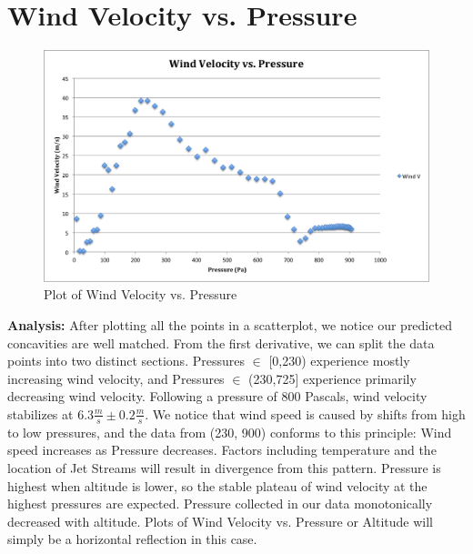 \documentclass{journal}
\begin{document}
\part{Wind Velocity vs. Pressure}
\begin{figure}[H]
\centering
\includegraphics[width=5in]{IMG1CDATA.png}
\caption{Plot of Wind Velocity vs. Pressure}
\end{figure}

\begin{flushleft}
\textbf{Analysis:} After plotting all the points in a scatterplot, we notice our predicted concavities are well matched.  From the first derivative, we can split the data points into two distinct sections.  Pressures $\in$ [0,230) experience mostly increasing wind velocity, and Pressures $\in$ (230,725] experience primarily decreasing wind velocity.  Following a pressure of 800 Pascals, wind velocity stabilizes at $6.3\frac{m}{s} \pm 0.2\frac{m}{s}$.  We notice that wind speed is caused by shifts from high to low pressures, and the data from (230, 900) conforms to this principle: Wind speed increases as Pressure decreases.  Factors including temperature and the location of Jet Streams will result in divergence from this pattern.  Pressure is highest when altitude is lower, so the stable plateau of wind velocity at the highest pressures are expected.  Pressure collected in our data monotonically decreased with altitude.  Plots of Wind Velocity vs. Pressure or Altitude will simply be a horizontal reflection in this case.
\end{flushleft}
\end{document}
